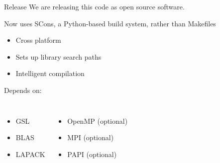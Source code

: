 \documentclass{beamer}
\begin{document}
    \begin{frame}{Release}
        We are releasing this code as open source software.

        \vfill

        Now uses SCons, a Python-based build system, rather than Makefiles
        \begin{itemize}
            \item Cross platform
            \item Sets up library search paths
            \item Intelligent compilation
        \end{itemize}

        \vfill

        Depends on:
        \begin{columns}
            \begin{itemize}
                \item GSL
                \item BLAS
                \item LAPACK
            \end{itemize}
            \begin{itemize}
                \item OpenMP (optional)
                \item MPI (optional)
                \item PAPI (optional)
            \end{itemize}
        \end{columns}
    \end{frame}
\end{document}
